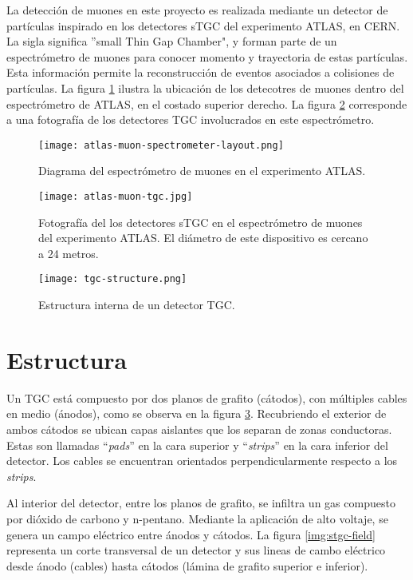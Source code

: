 
La detección de muones en este proyecto es realizada mediante un detector de partículas inspirado en los detectores sTGC del experimento ATLAS, en CERN. La sigla significa ''small Thin Gap Chamber", y forman parte de un espectrómetro de muones para conocer momento y trayectoria de estas partículas. Esta información permite la reconstrucción de eventos asociados a colisiones de partículas. La figura \ref{img:atlas-layout} ilustra la ubicación de los detecotres de muones dentro del espectrómetro de ATLAS, en el costado superior derecho. La figura \ref{img:atlas-tgc} corresponde a una fotografía de los detectores TGC involucrados en este espectrómetro.

\begin{figure}[h]
	\centering
	\texttt{[image: atlas-muon-spectrometer-layout.png]}
	\caption{Diagrama del espectrómetro de muones en el experimento ATLAS\cite{DiehlE2009ATLASCommissioning}.}
	\label{img:atlas-layout}
\end{figure}

\newpage
\begin{figure}[h]
	\centering
	\texttt{[image: atlas-muon-tgc.jpg]}
	\caption{Fotografía del los detectores sTGC en el espectrómetro de muones del experimento ATLAS\cite{ATLASExperiment2020MuonSpectometer}. El diámetro de este dispositivo es cercano a 24 metros.}
	\label{img:atlas-tgc}
\end{figure}

\begin{figure}[h]
	\centering
	\texttt{[image: tgc-structure.png]}
	\caption{Estructura interna de un detector TGC\cite{Chapman2014ATLASUpgrade}.}
	\label{img:stgc-structure}
\end{figure}

\newpage
\section{Estructura}

	Un TGC está compuesto por dos planos de grafito (cátodos), con múltiples cables en medio (ánodos), como se observa en la figura \ref{img:stgc-structure}. Recubriendo el exterior de ambos cátodos se ubican capas aislantes que los separan de zonas conductoras. Estas son llamadas ``\textit{pads}'' en la cara superior y ``\textit{strips}'' en la cara inferior del detector. Los cables se encuentran orientados perpendicularmente respecto a los \textit{strips}.
	
	Al interior del detector, entre los planos de grafito, se infiltra un gas compuesto por dióxido de carbono y n-pentano. Mediante la aplicación de alto voltaje, se genera un campo eléctrico entre ánodos y cátodos. La figura \ref{img:stgc-field} representa un corte transversal de un detector y sus lineas de cambo eléctrico desde ánodo (cables) hasta cátodos (lámina de grafito superior e inferior).
	
